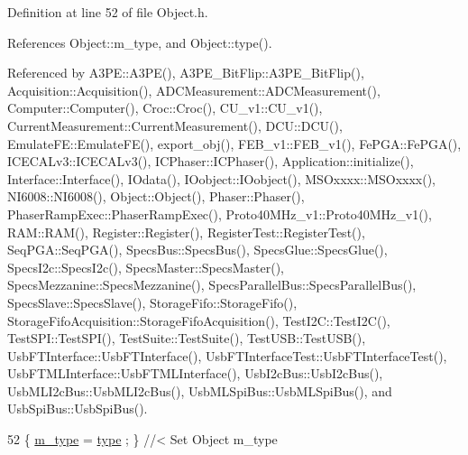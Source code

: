Definition at line 52 of file Object.\+h.



References Object\+::m\+\_\+type, and Object\+::type().



Referenced by A3\+P\+E\+::\+A3\+P\+E(), A3\+P\+E\+\_\+\+Bit\+Flip\+::\+A3\+P\+E\+\_\+\+Bit\+Flip(), Acquisition\+::\+Acquisition(), A\+D\+C\+Measurement\+::\+A\+D\+C\+Measurement(), Computer\+::\+Computer(), Croc\+::\+Croc(), C\+U\+\_\+v1\+::\+C\+U\+\_\+v1(), Current\+Measurement\+::\+Current\+Measurement(), D\+C\+U\+::\+D\+C\+U(), Emulate\+F\+E\+::\+Emulate\+F\+E(), export\+\_\+obj(), F\+E\+B\+\_\+v1\+::\+F\+E\+B\+\_\+v1(), Fe\+P\+G\+A\+::\+Fe\+P\+G\+A(), I\+C\+E\+C\+A\+Lv3\+::\+I\+C\+E\+C\+A\+Lv3(), I\+C\+Phaser\+::\+I\+C\+Phaser(), Application\+::initialize(), Interface\+::\+Interface(), I\+Odata(), I\+Oobject\+::\+I\+Oobject(), M\+S\+Oxxxx\+::\+M\+S\+Oxxxx(), N\+I6008\+::\+N\+I6008(), Object\+::\+Object(), Phaser\+::\+Phaser(), Phaser\+Ramp\+Exec\+::\+Phaser\+Ramp\+Exec(), Proto40\+M\+Hz\+\_\+v1\+::\+Proto40\+M\+Hz\+\_\+v1(), R\+A\+M\+::\+R\+A\+M(), Register\+::\+Register(), Register\+Test\+::\+Register\+Test(), Seq\+P\+G\+A\+::\+Seq\+P\+G\+A(), Specs\+Bus\+::\+Specs\+Bus(), Specs\+Glue\+::\+Specs\+Glue(), Specs\+I2c\+::\+Specs\+I2c(), Specs\+Master\+::\+Specs\+Master(), Specs\+Mezzanine\+::\+Specs\+Mezzanine(), Specs\+Parallel\+Bus\+::\+Specs\+Parallel\+Bus(), Specs\+Slave\+::\+Specs\+Slave(), Storage\+Fifo\+::\+Storage\+Fifo(), Storage\+Fifo\+Acquisition\+::\+Storage\+Fifo\+Acquisition(), Test\+I2\+C\+::\+Test\+I2\+C(), Test\+S\+P\+I\+::\+Test\+S\+P\+I(), Test\+Suite\+::\+Test\+Suite(), Test\+U\+S\+B\+::\+Test\+U\+S\+B(), Usb\+F\+T\+Interface\+::\+Usb\+F\+T\+Interface(), Usb\+F\+T\+Interface\+Test\+::\+Usb\+F\+T\+Interface\+Test(), Usb\+F\+T\+M\+L\+Interface\+::\+Usb\+F\+T\+M\+L\+Interface(), Usb\+I2c\+Bus\+::\+Usb\+I2c\+Bus(), Usb\+M\+L\+I2c\+Bus\+::\+Usb\+M\+L\+I2c\+Bus(), Usb\+M\+L\+Spi\+Bus\+::\+Usb\+M\+L\+Spi\+Bus(), and Usb\+Spi\+Bus\+::\+Usb\+Spi\+Bus().


\begin{DoxyCode}
52 \{ \hyperlink{classObject_a457a600fe8c00eb1034374f75110a78c}{m\_type}  = \hyperlink{classObject_a84f99f70f144a83e1582d1d0f84e4e62}{type}  ; \} \textcolor{comment}{//< Set Object m\_type}
\end{DoxyCode}
\mbox{\label{classIOdata_aa9ade5ce3944c8e2b831533b6f876caf}} 
